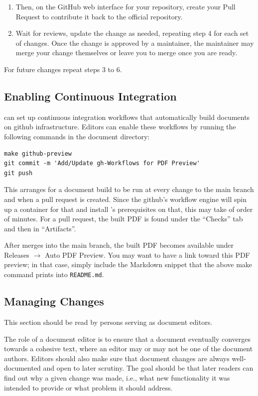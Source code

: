 \documentclass[11pt,a4paper]{ivoa}
\begin{document}
\begin{enumerate}
\item  Then, on the GitHub web interface for your repository, create
your Pull Request to contribute it back to the official repository.

\item  Wait for reviews, update the change as needed, repeating step 4
for each set of changes. Once the change is approved by a maintainer,
the maintainer may merge your change themselves or leave you to merge
once you are ready.
\end{enumerate}

For future changes repeat steps 3 to 6.

\subsection{Enabling Continuous Integration}

\ivoatex{} can set up continuous integration workflows that
automatically build documents on github infrastructure.  Editors can
enable these workflows by running the following commands in the document
directory:

\begin{lstlisting}
make github-preview
git commit -m 'Add/Update gh-Workflows for PDF Preview'
git push
\end{lstlisting}

This arranges for a document build to be run at every change to the main
branch and when a pull request is created.  Since the github's workflow
engine will spin up a container for that and install \ivoatex's
prerequisites on that, this may take of order of minutes.  For a pull
request, the built PDF is found under the ``Checks'' tab and then in
``Artifacts''.

After merges into the main branch, the built PDF becomes available under
Releases $\to$ Auto PDF Preview.  You may want to have a link toward
this PDF preview; in that case, simply include the Markdown snippet that
the above make command prints into \verb|README.md|.


\subsection{Managing Changes}
\label{sect:chmgt}

This section should be read by persons serving as document editors.

The role of a document editor is to ensure that a document eventually
converges towards a cohesive text, where an editor may or may not be one
of the document authors.  Editors should also make sure that
document changes are always well-documented and open to later scrutiny.
The goal should be that later readers can find out why a given change
was made, i.e., what new functionality it was intended to provide or
what problem it should address.
\end{document}
